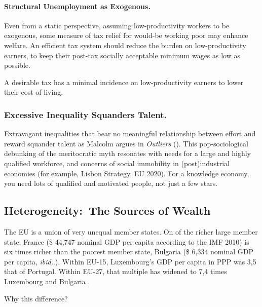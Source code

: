 \paragraph{Structural Unemployment as Exogenous.}
Even from a static perspective, assuming low-productivity workers to be exogenous, some measure of tax relief for would-be working poor may enhance welfare.
An efficient tax system should reduce the burden on low-productivity earners, to keep their post-tax socially acceptable minimum wages as low as possible.
\newpage
\begin{desideratum}
	A desirable tax has a minimal incidence on low-productivity earners to lower their cost of living.
	\label{des:low-price-floor}
\end{desideratum}

\subsubsection{Excessive Inequality Squanders Talent.}
Extravagant inequalities that bear no meaningful relationship between effort and reward squander talent as Malcolm \citeauthor{Gladwell} argues in \emph{Outliers} (\citeyear{Gladwell}).
This pop-sociological debunking of the meritocratic myth resonates with needs
for a large and highly qualified workforce, and concerns of social immobility in (post)industrial economies (for example, Lisbon Strategy, EU 2020).
For a knowledge economy, you need lots of qualified and motivated people, not just a few stars.

\subsection[Heterogeneity]{Heterogeneity:~The Sources of Wealth} \label{sec:sources-of-wealth} The \gls{EU} is a union of very unequal member states.
On of the richer large member state, France (\$ 44,747 nominal \gls{GDP} per capita according to the IMF 2010) is six times richer than the poorest member state, Bulgaria (\$ 6,334 nominal \gls{GDP} per capita, \emph{ibid.}.).
Within \gls{EU}-15, Luxembourg's \gls{GDP} per capita in \gls{PPP} was 3,5 that of Portugal.
Within \gls{EU}-27, that multiple has widened to 7,4 times Luxembourg and Bulgaria \citep[1]{Alber2008}.


Why this difference?

